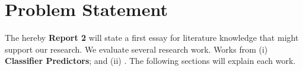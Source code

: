 \section{Problem Statement}

The hereby \textbf{Report 2} will state a first essay for literature knowledge that might support our research. We evaluate several research work. Works from (i) \textbf{Classifier Predictors}; and (ii) \textbf{}. The following sections will explain each work.